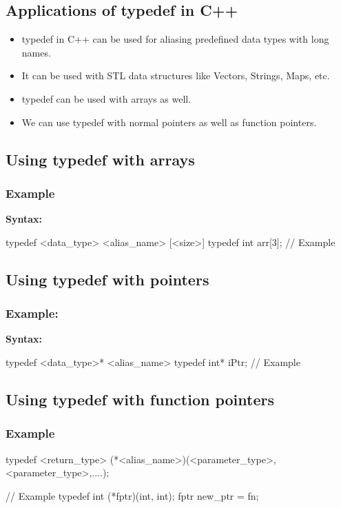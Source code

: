 \documentclass{report}
\begin{document}
    \subsection{Applications of typedef in C++}
    \bigbreak \noindent 
    \begin{itemize}
        \item typedef in C++ can be used for aliasing predefined data types with long names.
        \item It can be used with STL data structures like Vectors, Strings, Maps, etc.
        \item typedef can be used with arrays as well.
        \item We can use typedef with normal pointers as well as function pointers.
    \end{itemize}
    \bigbreak \noindent 
    \subsection{Using typedef with arrays}
    \bigbreak \noindent 
    \subsubsection{Example}
    \bigbreak \noindent 
    \textbf{Syntax:}
    \bigbreak \noindent 
    \begin{cppcode}
    typedef <data_type> <alias_name> [<size>]
    typedef int arr[3];  // Example
    \end{cppcode}

    \pagebreak 
    \subsection{Using typedef with pointers}
    \bigbreak \noindent 
    \subsubsection{Example:}
    \bigbreak \noindent 
    \textbf{Syntax:}
    \bigbreak \noindent 
    \begin{cppcode}
    typedef <data_type>* <alias_name>
    typedef int* iPtr; // Example
    \end{cppcode}

    \bigbreak \noindent 
    \subsection{Using typedef with function pointers}
    \bigbreak \noindent 
    \subsubsection{Example}
    \bigbreak \noindent 
    \begin{cppcode}
    typedef <return_type> (*<alias_name>)(<parameter_type>,<parameter_type>,....);

    // Example
    typedef int (*fptr)(int, int);
    fptr new_ptr = fn; 
    \end{cppcode}
\end{document}
